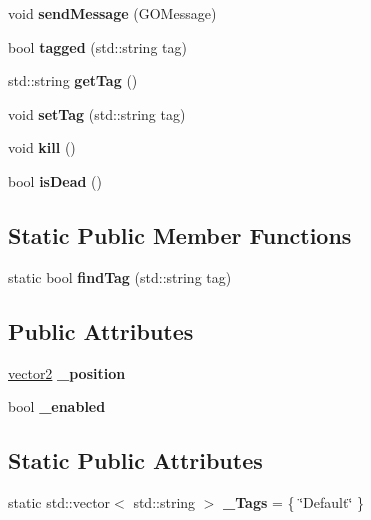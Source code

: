 \begin{DoxyCompactItemize}
void {\bfseries send\+Message} (G\+O\+Message)
\item 
\hypertarget{class_game_object_ac214d8070daddbffd595afdc69c02fd0}{}\label{class_game_object_ac214d8070daddbffd595afdc69c02fd0} 
bool {\bfseries tagged} (std\+::string tag)
\item 
\hypertarget{class_game_object_a099a32d11225032f9a1a35d15a307a27}{}\label{class_game_object_a099a32d11225032f9a1a35d15a307a27} 
std\+::string {\bfseries get\+Tag} ()
\item 
\hypertarget{class_game_object_a2c5d76ea1ebd18e6c3e74cdd680ed349}{}\label{class_game_object_a2c5d76ea1ebd18e6c3e74cdd680ed349} 
void {\bfseries set\+Tag} (std\+::string tag)
\item 
\hypertarget{class_game_object_af54107b086de78b1fc6190088bdfb468}{}\label{class_game_object_af54107b086de78b1fc6190088bdfb468} 
void {\bfseries kill} ()
\item 
\hypertarget{class_game_object_af509340fc9f95d8d39afe7ec63d90128}{}\label{class_game_object_af509340fc9f95d8d39afe7ec63d90128} 
bool {\bfseries is\+Dead} ()
\end{DoxyCompactItemize}
\subsection*{Static Public Member Functions}
\begin{DoxyCompactItemize}
\item 
\hypertarget{class_game_object_a2ceae5dbcdd0e8621d08c6c461068a2b}{}\label{class_game_object_a2ceae5dbcdd0e8621d08c6c461068a2b} 
static bool {\bfseries find\+Tag} (std\+::string tag)
\end{DoxyCompactItemize}
\subsection*{Public Attributes}
\begin{DoxyCompactItemize}
\item 
\hypertarget{class_game_object_a86822412aab633fe5a2a78678fdf55b7}{}\label{class_game_object_a86822412aab633fe5a2a78678fdf55b7} 
\hyperlink{structvector2}{vector2} {\bfseries \+\_\+position}
\item 
\hypertarget{class_game_object_ac1f91cb46f40c3b254505d66a9da1653}{}\label{class_game_object_ac1f91cb46f40c3b254505d66a9da1653} 
bool {\bfseries \+\_\+enabled}
\end{DoxyCompactItemize}
\subsection*{Static Public Attributes}
\begin{DoxyCompactItemize}
\item 
\hypertarget{class_game_object_af3e9291ac62f2c143d14f2885058182e}{}\label{class_game_object_af3e9291ac62f2c143d14f2885058182e} 
static std\+::vector$<$ std\+::string $>$ {\bfseries \+\_\+\+Tags} = \{ \char`\"{}Default\char`\"{} \}
\end{DoxyCompactItemize}


